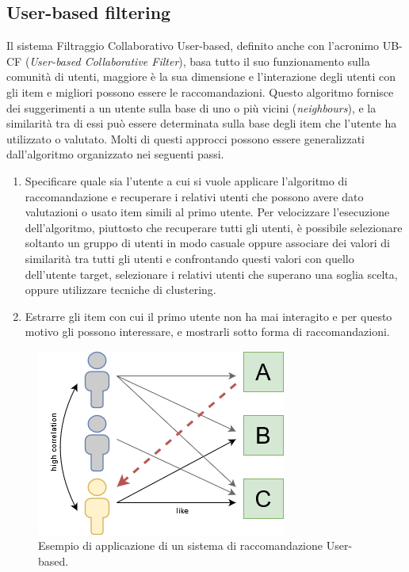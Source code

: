 \subsection{User-based filtering}
Il sistema Filtraggio Collaborativo User-based, definito anche con l'acronimo UB-CF (\textit{User-based Collaborative Filter}), basa tutto il suo 
funzionamento sulla comunità di utenti, maggiore è la sua dimensione e l'interazione degli utenti con gli item e migliori possono essere le 
raccomandazioni. Questo algoritmo fornisce dei suggerimenti a un utente sulla base di uno o più vicini (\textit{neighbours}), e la similarità 
tra di essi può essere determinata sulla base degli item che l'utente ha utilizzato o valutato.\hfill\break
Molti di questi approcci possono essere generalizzati dall'algoritmo organizzato nei seguenti passi.
\begin{enumerate}
    \item Specificare quale sia l'utente a cui si vuole applicare l'algoritmo di raccomandazione e recuperare i relativi utenti che possono 
    avere dato valutazioni o usato item simili al primo utente. Per velocizzare l'esecuzione dell'algoritmo, piuttosto che recuperare tutti 
    gli utenti, è possibile selezionare soltanto un gruppo di utenti in modo casuale oppure associare dei valori di similarità tra 
    tutti gli utenti e confrontando questi valori con quello dell'utente target, selezionare i relativi utenti che superano una soglia 
    scelta, oppure utilizzare tecniche di clustering.
    \item Estrarre gli item con cui il primo utente non ha mai interagito e per questo motivo gli possono interessare, e mostrarli 
    sotto forma di raccomandazioni.
\end{enumerate}
\begin{figure}[ht!]
    \centering
    \includegraphics[scale=0.5]{images/UB_CF_ex.png}
    \caption[Applicazione di un sistema di raccomandazione UB-CF]{Esempio di applicazione di un sistema di raccomandazione User-based.}
    \label{fig:UB_CF}
\end{figure}
